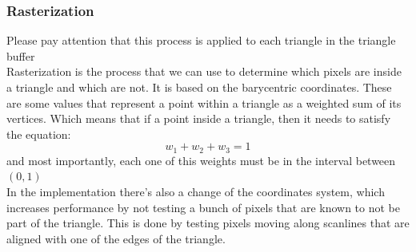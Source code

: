\documentclass{article}
\begin{document}
\subsubsection{Rasterization}
Please pay attention that this process is applied to each triangle in the triangle buffer
\\[.5cm]
Rasterization is the process that we can use to determine which pixels are inside a triangle and which are not. It is based on the barycentric coordinates. These are some values that represent a point within a triangle as a weighted sum of its vertices. Which means that if a point inside a triangle, then it needs to satisfy the equation:
$$w_1 + w_2 + w_3 = 1$$ and most importantly, each one of this weights must be in the interval between $(0, 1)$
\\[.5cm]
In the implementation there's also a change of the coordinates system, which increases performance by not testing a bunch of pixels that are known to not be part of the triangle. This is done by testing pixels moving along scanlines that are aligned with one of the edges of the triangle.
\\[.5cm]
\end{document}
